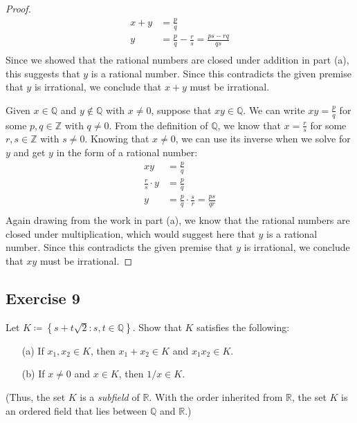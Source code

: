 \documentclass[12pt]{article}
\begin{document}
\begin{itemize}
\begin{proof}
\begin{align*}
x + y &= \frac{p}{q} \\
y &= \frac{p}{q} - \frac{r}{s} = \frac{ps - rq}{qs} \\
\end{align*}
Since we showed that the rational numbers are closed under addition in part (a), this suggests that $y$ is a rational number. Since this contradicts the given premise that $y$ is irrational, we conclude that $x + y$ must be irrational.

Given $x \in \mathbb{Q}$ and $y \notin \mathbb{Q}$ with $x \neq 0$, suppose that $xy \in \mathbb{Q}$. We can write $xy = \frac{p}{q}$ for some $p, q \in \mathbb{Z}$ with $q \neq 0$. From the definition of $\mathbb{Q}$, we know that $x = \frac{r}{s}$ for some $r, s \in \mathbb{Z}$ with $s \neq 0$. Knowing that $x \neq 0$, we can use its inverse when we solve for $y$ and get $y$ in the form of a rational number:
\begin{align*}
xy &= \frac{p}{q} \\
\frac{r}{s} \cdot y &= \frac{p}{q} \\
y &= \frac{p}{q} \cdot \frac{s}{r} = \frac{ps}{qr} \\
\end{align*}
Again drawing from the work in part (a), we know that the rational numbers are closed under multiplication, which would suggest here that $y$ is a rational number. Since this contradicts the given premise that $y$ is irrational, we conclude that $xy$ must be irrational.
\end{proof}
\end{itemize}

\subsection*{Exercise 9}
Let $K \coloneqq \left\{s + t\sqrt{2} : s, t \in \mathbb{Q}\right\}$. Show that $K$ satisfies the following:
\begin{itemize}
\item[(a)] If $x_1, x_2 \in K$, then $x_1 + x_2 \in K$ and $x_1x_2 \in K$.
\item[(b)] If $x \neq 0$ and $x \in K$, then $1/x \in K$.
\end{itemize}
(Thus, the set $K$ is a {\it subfield} of $\mathbb{R}$. With the order inherited from $\mathbb{R}$, the set $K$ is an ordered field that lies between $\mathbb{Q}$ and $\mathbb{R}$.)
\end{document}
